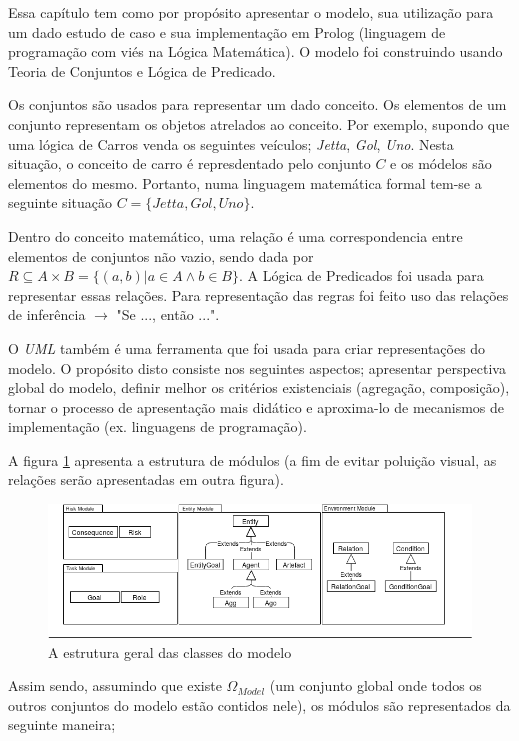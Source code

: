 Essa capítulo tem como por propósito apresentar o modelo, sua utilização para um dado estudo de caso e sua implementação 
em Prolog (linguagem de programação com viés na Lógica Matemática). O modelo foi construindo usando Teoria de Conjuntos
e Lógica de Predicado.

Os conjuntos são usados para representar um dado conceito. Os elementos de um conjunto representam os objetos atrelados ao 
conceito. Por exemplo, supondo que uma lógica de Carros venda os seguintes veículos; \textit{Jetta}, \textit{Gol}, \textit{Uno}.
Nesta situação, o conceito de carro é represdentado pelo conjunto $C$ e os módelos são elementos do mesmo. Portanto, numa linguagem
matemática formal tem-se a seguinte situação $C = \{Jetta,Gol,Uno\}$. 

Dentro do conceito matemático, uma relação é uma correspondencia entre elementos de conjuntos não vazio, sendo dada por
$R \subseteq  A \times B = \{(a,b)| a \in A \wedge b \in B \}$. A Lógica de Predicados foi usada para representar essas
relações. Para representação das regras foi feito uso das relações de inferência $\rightarrow$ "Se ..., então ...".  

O \textit{UML} também é uma ferramenta que foi usada para criar representações do modelo. O propósito disto consiste nos
seguintes aspectos; apresentar perspectiva global do modelo, definir melhor os critérios existenciais (agregação, composição),
tornar o processo de apresentação mais didático e aproxima-lo de mecanismos de implementação (ex. linguagens de programação). 

A figura \ref{module} apresenta a estrutura de módulos (a fim de evitar poluição visual, as relações serão apresentadas
em outra figura). 

\begin{figure}[H]
  \centering
  \includegraphics[width=1\linewidth]{figure/Module.png} 
  \caption{A estrutura geral das classes do modelo}
  \label{module}
\end{figure}

Assim sendo, assumindo que existe $\Omega_{Model}$ (um conjunto global onde todos os outros conjuntos do modelo estão 
contidos nele), os módulos são representados da seguinte maneira; 


